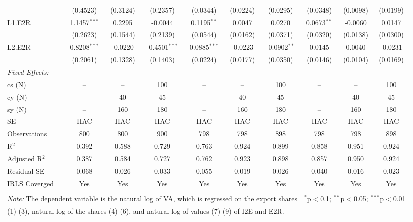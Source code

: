 \documentclass[a4paper]{article}
\begin{document}
\begin{table}[!t]
{\begin{tabular}[t]{lccccccccc}
  & (0.4523) & (0.3124) & (0.2357) & (0.0344) & (0.0224) & (0.0295) & (0.0348) & (0.0098) & (0.0199) \\ 
 L1.E2R & 1.1457$^{***}$ & 0.2295 & -0.0044 & 0.1195$^{**}$ & 0.0047 & 0.0270 & 0.0673$^{**}$ & -0.0060 & 0.0147 \\ 
  & (0.2623) & (0.1544) & (0.2139) & (0.0544) & (0.0162) & (0.0371) & (0.0320) & (0.0138) & (0.0300) \\ 
 L2.E2R & 0.8208$^{***}$ & -0.0220 & -0.4501$^{***}$ & 0.0885$^{***}$ & -0.0223 & -0.0902$^{**}$ & 0.0145 & 0.0040 & -0.0231 \\ 
  & (0.2061) & (0.1328) & (0.1403) & (0.0224) & (0.0177) & (0.0350) & (0.0146) & (0.0104) & (0.0169) \\ 
\midrule \emph{Fixed-Effects:} &   &   &   &   &   &  \\
cs (N) & -- & -- & 100 & -- & -- & 100 & -- & -- & 100\\
cy (N) & -- & 40 & 45 & -- & 40 & 45 & -- & 40 & 45\\
sy (N) & -- & 160 & 180 & -- & 160 & 180 & -- & 160 & 180\\
\midrule
SE & HAC & HAC & HAC &HAC &HAC &HAC &HAC &HAC &HAC \\
Observations & 800 & 800 & 900 & 798 & 798 & 898 & 798 & 798 & 898 \\ 
R$^{2}$ & 0.392 & 0.588 & 0.729 & 0.763 & 0.924 & 0.899 & 0.858 & 0.951 & 0.924 \\ 
Adjusted R$^{2}$ & 0.387 & 0.584 & 0.727 & 0.762 & 0.923 & 0.898 & 0.857 & 0.950 & 0.924 \\ 
Residual SE & 0.068 & 0.026 & 0.033 & 0.055 & 0.019 & 0.026 & 0.040 & 0.016 & 0.023 \\ 
IRLS Coverged & Yes & Yes & Yes & Yes & Yes & Yes & Yes & Yes & Yes \\ \bottomrule \\[-1em]
\multicolumn{7}{l}{\small \textit{Note:} The dependent variable is the natural log of VA, which is regressed on the  export shares}   & \multicolumn{3}{r}{$^{*}$p$<$0.1; $^{**}$p$<$0.05; $^{***}$p$<$0.01} \\ [-0.2em]
\multicolumn{10}{l}{\small \quad \quad \quad (1)-(3), natural log of the shares (4)-(6), and natural log of values (7)-(9) of I2E and E2R.} \\
\end{tabular} 
}
\end{table} 
\FloatBarrier
\end{document}
